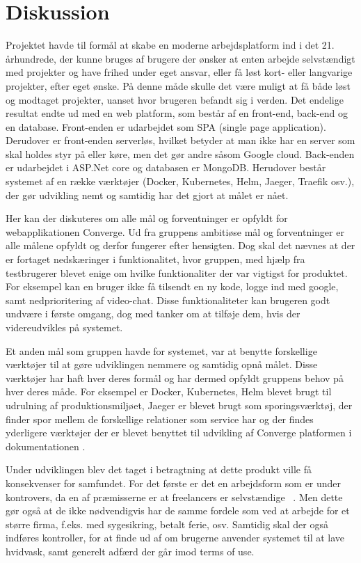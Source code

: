 \chapter{Diskussion}
\label{cha:discussion}

Projektet havde til formål at skabe en moderne arbejdsplatform ind i det 21. århundrede, der kunne bruges af brugere der ønsker at enten arbejde selvstændigt med projekter og have frihed under eget ansvar, eller få løst kort- eller langvarige projekter, efter eget ønske. På denne måde skulle det være muligt at få både løst og modtaget projekter, uanset hvor brugeren befandt sig i verden. Det endelige resultat endte ud med en web platform, som består af en front-end, back-end og en database. Front-enden er udarbejdet som SPA (single page application). Derudover er front-enden serverløs, hvilket betyder at man ikke har en server som skal holdes styr på eller køre, men det gør andre såsom Google cloud. Back-enden er udarbejdet i ASP.Net core og databasen er MongoDB. Herudover består systemet af en række værktøjer (Docker, Kubernetes, Helm, Jaeger, Traefik osv.), der gør udvikling nemt og samtidig har det gjort at målet er nået.

Her kan der diskuteres om alle mål og forventninger er opfyldt for webapplikationen Converge. Ud fra gruppens ambitiøse mål og forventninger er alle målene opfyldt og derfor fungerer efter hensigten. Dog skal det nævnes at der er fortaget nedskæringer i funktionalitet, hvor gruppen, med hjælp fra testbrugerer blevet enige om hvilke funktionaliter der var vigtigst for produktet. For eksempel kan en bruger ikke få tilsendt en ny kode, logge ind med google, samt nedprioritering af video-chat. Disse funktionaliteter kan brugeren godt undvære i første omgang, dog med tanker om at tilføje dem, hvis der videreudvikles på systemet. 

Et anden mål som gruppen havde for systemet, var at benytte forskellige værktøjer til at gøre udviklingen nemmere og samtidig opnå målet. Disse værktøjer har haft hver deres formål og har dermed opfyldt gruppens behov på hver deres måde. For eksempel er Docker, Kubernetes, Helm blevet brugt til udrulning af produktionsmiljøet, Jaeger er blevet brugt som sporingsværktøj, der finder spor mellem de forskellige relationer som service har og der findes yderligere værktøjer der er blevet benyttet til udvikling af Converge platformen i dokumentationen \cite{Research}.

Under udviklingen blev det taget i betragtning at dette produkt ville få konsekvenser for samfundet. For det første er det en arbejdsform som er under kontrovers, da en af præmisserne er at freelancers er selvstændige ~\cite{controversy}. Men dette gør også at de ikke nødvendigvis har de samme fordele som ved at arbejde for et større firma, f.eks. med sygesikring, betalt ferie, osv. Samtidig skal der også indføres kontroller, for at finde ud af om brugerne anvender systemet til at lave hvidvask, samt generelt adfærd der går imod terms of use.

